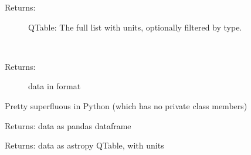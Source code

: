 \documentclass[letterpaper,10pt,english]{sphinxmanual}
\begin{document}
\begin{fulllineitems}
\begin{fulllineitems}
\begin{description}
\begin{description}
\end{description}

\item[{Returns:}] \leavevmode
QTable: The full list with units, optionally filtered by type.

\end{description}

\end{fulllineitems}


\begin{fulllineitems}
\label{\detokenize{galaxy:galaxy.galaxy.Galaxy.get_array}}~\begin{description}
\item[{Returns: }] \leavevmode
data in  format

\end{description}

Pretty superfluous in Python (which has no private class members)

\end{fulllineitems}


\begin{fulllineitems}
\label{\detokenize{galaxy:galaxy.galaxy.Galaxy.get_df}}
Returns:
data as pandas dataframe

\end{fulllineitems}


\begin{fulllineitems}
\label{\detokenize{galaxy:galaxy.galaxy.Galaxy.get_qtable}}
Returns:
data as astropy QTable, with units

\end{fulllineitems}


\end{fulllineitems}
\end{document}
